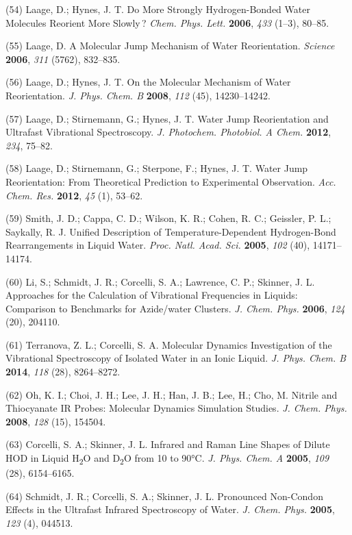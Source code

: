 \documentclass[]{article}
\begin{document}
(54) Laage, D.; Hynes, J. T. Do More Strongly Hydrogen-Bonded Water
Molecules Reorient More Slowly\,? \emph{Chem. Phys. Lett.}
\textbf{2006}, \emph{433} (1--3), 80--85.

(55) Laage, D. A Molecular Jump Mechanism of Water Reorientation.
\emph{Science} \textbf{2006}, \emph{311} (5762), 832--835.

(56) Laage, D.; Hynes, J. T. On the Molecular Mechanism of Water
Reorientation. \emph{J. Phys. Chem. B} \textbf{2008}, \emph{112} (45),
14230--14242.

(57) Laage, D.; Stirnemann, G.; Hynes, J. T. Water Jump Reorientation
and Ultrafast Vibrational Spectroscopy. \emph{J. Photochem. Photobiol. A
Chem.} \textbf{2012}, \emph{234}, 75--82.

(58) Laage, D.; Stirnemann, G.; Sterpone, F.; Hynes, J. T. Water Jump
Reorientation: From Theoretical Prediction to Experimental Observation.
\emph{Acc. Chem. Res.} \textbf{2012}, \emph{45} (1), 53--62.

(59) Smith, J. D.; Cappa, C. D.; Wilson, K. R.; Cohen, R. C.; Geissler,
P. L.; Saykally, R. J. Unified Description of Temperature-Dependent
Hydrogen-Bond Rearrangements in Liquid Water. \emph{Proc. Natl. Acad.
Sci.} \textbf{2005}, \emph{102} (40), 14171--14174.

(60) Li, S.; Schmidt, J. R.; Corcelli, S. A.; Lawrence, C. P.; Skinner,
J. L. Approaches for the Calculation of Vibrational Frequencies in
Liquids: Comparison to Benchmarks for Azide/water Clusters. \emph{J.
Chem. Phys.} \textbf{2006}, \emph{124} (20), 204110.

(61) Terranova, Z. L.; Corcelli, S. A. Molecular Dynamics Investigation
of the Vibrational Spectroscopy of Isolated Water in an Ionic Liquid.
\emph{J. Phys. Chem. B} \textbf{2014}, \emph{118} (28), 8264--8272.

(62) Oh, K. I.; Choi, J. H.; Lee, J. H.; Han, J. B.; Lee, H.; Cho, M.
Nitrile and Thiocyanate IR Probes: Molecular Dynamics Simulation
Studies. \emph{J. Chem. Phys.} \textbf{2008}, \emph{128} (15), 154504.

(63) Corcelli, S. A.; Skinner, J. L. Infrared and Raman Line Shapes of
Dilute HOD in Liquid H\textsubscript{2}O and D\textsubscript{2}O from 10
to 90°C. \emph{J. Phys. Chem. A} \textbf{2005}, \emph{109} (28),
6154--6165.

(64) Schmidt, J. R.; Corcelli, S. A.; Skinner, J. L. Pronounced
Non-Condon Effects in the Ultrafast Infrared Spectroscopy of Water.
\emph{J. Chem. Phys.} \textbf{2005}, \emph{123} (4), 044513.
\end{document}
